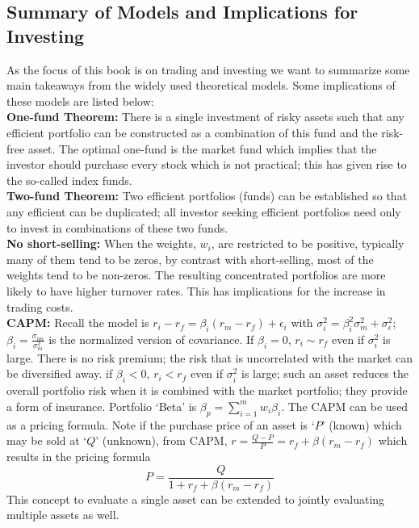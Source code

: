 	
\subsection{Summary of Models and Implications for Investing}


As the focus of this book is on trading and investing we want to summarize some main takeaways from the widely used theoretical models. Some implications of these models are listed below: \\

\noindent\textbf{One-fund Theorem:} There is a single investment of risky assets such that any efficient portfolio can be constructed as a combination of this fund and the risk-free asset. The optimal one-fund is the market fund which implies that the investor should purchase every stock which is not practical; this has given rise to the so-called index funds. \\

\noindent\textbf{Two-fund Theorem:} Two efficient portfolios (funds) can be established so that any efficient can be duplicated; all investor seeking efficient portfolios need only to invest in combinations of these two funds. \\

\noindent \textbf{No short-selling:} When the weights, $w_i$, are restricted to be positive, typically many of them tend to be zeros, by contrast with short-selling, most of the weights tend to be non-zeros. The resulting concentrated portfolios are more likely to have higher turnover rates. This has implications for the increase in trading costs. \\

\noindent\textbf{CAPM:} Recall the model is $r_i-r_f=\beta_i(r_m-r_f)+\epsilon_i$ with $\sigma_i^2=\beta_i^2\sigma^2_m + \sigma_\epsilon^2$; $\beta_i=\frac{\sigma_{im}}{\sigma_m^2}$ is the normalized version of covariance. If $\beta_i=0$, $r_i \sim r_f$ even if $\sigma_i^2$ is large. There is no risk premium; the risk that is uncorrelated with the market can be diversified away. if $\beta_i<0$, $r_i<r_f$ even if $\sigma_i^2$ is large; such an asset reduces the overall portfolio risk when it is combined with the market portfolio; they provide a form of insurance. Portfolio `Beta' is $\beta_p= \sum_{i=1}^m w_i \beta_i$. The CAPM can be used as a pricing formula. Note if the purchase price of an asset is `$P$' (known) which may be sold at `$Q$' (unknown), from CAPM, $r=\frac{Q-P}{P}=r_f+\beta(r_m-r_f)$ which results in the pricing formula
	\begin{equation}\label{eqn:pricing}
	P=\dfrac{Q}{1+r_f+\beta(r_m-r_f)}
	\end{equation}
This concept to evaluate a single asset can be extended to jointly evaluating multiple assets as well. \\


